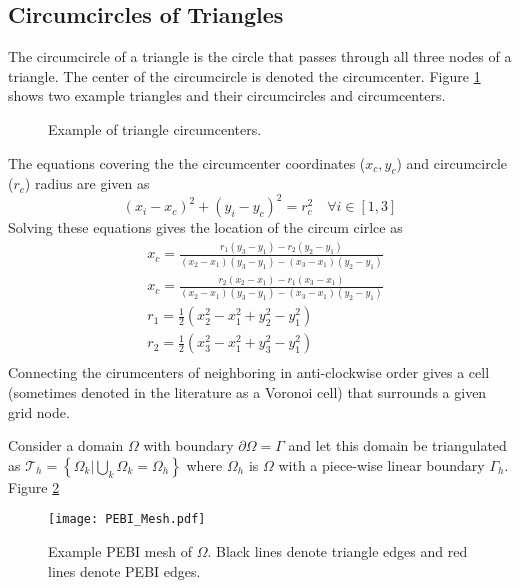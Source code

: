 \documentclass[letterpaper]{article}
\newcommand{\figref}[1]{Figure \ref{#1}}                %
\newcommand{\half}{\frac{1}{2}}
\newcommand{\avg}[1]{\left\{ #1 \right\} }
\newcommand{\paren}[1]{\left( #1 \right)}
\newcommand{\figwidth}{.48\textwidth}
\begin{document}
\subsection{Circumcircles of Triangles}
The circumcircle of a triangle is the circle that passes through all three nodes of a triangle.  The center of the circumcircle is denoted the circumcenter.  \figref{fig:tri_circumcenter} shows two example triangles and their circumcircles and circumcenters.  
\begin{figure}[h!]
\centering
{}
\caption{Example of triangle circumcenters.}
\label{fig:tri_circumcenter}
\end{figure}
The equations covering the the circumcenter coordinates ($x_{c}, y_{c}$) and circumcircle ($r_{c}$) radius are given as 
\begin{equation}
\paren{x_{i} - x_{c}}^{2} + \paren{y_{i} - y_{c}}^{2} = r_{c}^{2} \quad \forall i \in [1,3]
\end{equation}
Solving these equations gives the location of the circum cirlce as
\begin{equation}
\begin{split}
& x_{c} = \frac{ r_{1}\paren{y_{3} - y_{1}} - r_{2}\paren{y_{2} - y_{1}} }{\paren{x_{2} - x_{1}}\paren{y_{3} - y_{1}} - \paren{x_{3} - x_{1}}\paren{y_{2} - y_{1}}} \\
& x_{c} = \frac{ r_{2}\paren{x_{2} - x_{1}} - r_{1}\paren{x_{3} - x_{1}} }{\paren{x_{2} - x_{1}}\paren{y_{3} - y_{1}} - \paren{x_{3} - x_{1}}\paren{y_{2} - y_{1}}} \\
& r_{1} = \half\paren{x_{2}^{2} - x_{1}^2 + y_{2}^{2} - y_{1}^{2}} \\
& r_{2} = \half\paren{x_{3}^{2} - x_{1}^2 + y_{3}^{2} - y_{1}^{2}} \\ 
\end{split}
\end{equation}
Connecting the cirumcenters of neighboring in anti-clockwise order gives a cell (sometimes denoted in the literature as a Voronoi cell) that surrounds a given grid node.  

Consider a domain $\Omega$ with boundary $\partial \Omega = \Gamma$ and let this domain be triangulated as $\mathcal{T}_{h} = \avg{ \Omega_{k} \vert \bigcup_{k} \Omega_{k} = \Omega_{h}}$ where $\Omega_{h}$ is $\Omega$ with a piece-wise linear boundary $\Gamma_{h}$.  
\figref{fig:PEBI_mesh}
\begin{figure}[h!]
\centering
\texttt{[image: PEBI\_Mesh.pdf]}
\caption{Example PEBI mesh of $\Omega$.  Black lines denote triangle edges and red lines denote PEBI edges.}
\label{fig:PEBI_mesh}
\end{figure}
\end{document}
